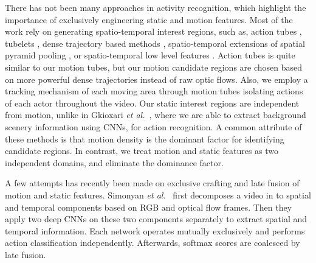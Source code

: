 
There has not been many approaches in activity recognition, which highlight the
importance of exclusively engineering static and motion features. Most of the work
rely on generating spatio-temporal interest regions, such as, action tubes \cite{gkioxari2015finding},
tubelets \cite{jain2014action}, dense trajectory based methods \cite{van2015apt, wang2015action},
spatio-temporal extensions of spatial pyramid pooling \cite{laptev2008learning},
or spatio-temporal low level features  \cite{schuldt2004recognizing, ke2005efficient,shechtman2005space, wang2011action, klaser2008spatio, yu2010real}. Action tubes \cite{gkioxari2015finding} is quite similar to
our motion tubes, but our motion candidate regions are chosen based on more powerful dense trajectories \cite{wang2011action} instead of
raw optic flows. Also, we employ a tracking mechanism of each moving area through motion tubes isolating actions
of each actor throughout the video. Our static interest regions are independent from motion,
unlike in Gkioxari \textit{et al.}~\cite{gkioxari2015finding}, where we are able to extract background scenery information using CNNs, for
action recognition.
A common attribute of these methods is that motion density is the
dominant factor for identifying candidate regions.
In contrast, we treat motion and static features
as two independent domains, and eliminate the dominance factor.

A few attempts has recently been made on exclusive crafting and late fusion
of motion and static features. Simonyan \textit{et al.}~\cite{simonyan2014two} first decomposes a video in to
spatial and temporal components based on RGB and optical flow frames.
Then they apply two deep CNNs on these two components separately to extract spatial and
temporal information. Each network operates mutually exclusively and performs action classification
independently. Afterwards, softmax scores are coalesced by late fusion.

